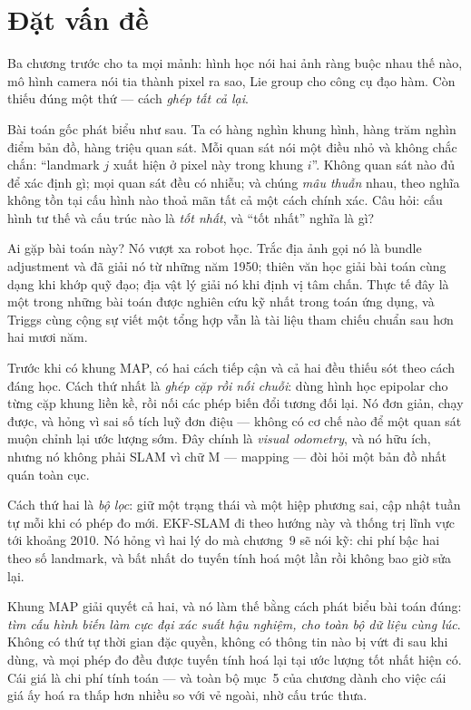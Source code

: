 \documentclass[../../vslam.tex]{subfiles}
\begin{document}
\section{Đặt vấn đề}

Ba chương trước cho ta mọi mảnh: hình học nói hai ảnh ràng buộc nhau thế nào, mô hình camera nói tia thành pixel ra sao, Lie group cho công cụ đạo hàm. Còn thiếu đúng một thứ --- cách \emph{ghép tất cả lại}.

Bài toán gốc phát biểu như sau. Ta có hàng nghìn khung hình, hàng trăm nghìn điểm bản đồ, hàng triệu quan sát. Mỗi quan sát nói một điều nhỏ và không chắc chắn: ``landmark \(j\) xuất hiện ở pixel này trong khung \(i\)''. Không quan sát nào đủ để xác định gì; mọi quan sát đều có nhiễu; và chúng \emph{mâu thuẫn} nhau, theo nghĩa không tồn tại cấu hình nào thoả mãn tất cả một cách chính xác. Câu hỏi: cấu hình tư thế và cấu trúc nào là \emph{tốt nhất}, và ``tốt nhất'' nghĩa là gì?

Ai gặp bài toán này? Nó vượt xa robot học. Trắc địa ảnh gọi nó là bundle adjustment và đã giải nó từ những năm 1950; thiên văn học giải bài toán cùng dạng khi khớp quỹ đạo; địa vật lý giải nó khi định vị tâm chấn. Thực tế đây là một trong những bài toán được nghiên cứu kỹ nhất trong toán ứng dụng, và Triggs cùng cộng sự \cite{triggs2000ba} viết một tổng hợp vẫn là tài liệu tham chiếu chuẩn sau hơn hai mươi năm.

Trước khi có khung MAP, có hai cách tiếp cận và cả hai đều thiếu sót theo cách đáng học. Cách thứ nhất là \emph{ghép cặp rồi nối chuỗi}: dùng hình học epipolar cho từng cặp khung liền kề, rồi nối các phép biến đổi tương đối lại. Nó đơn giản, chạy được, và hỏng vì sai số tích luỹ đơn điệu --- không có cơ chế nào để một quan sát muộn chỉnh lại ước lượng sớm. Đây chính là \emph{visual odometry}, và nó hữu ích, nhưng nó không phải SLAM vì chữ M --- mapping --- đòi hỏi một bản đồ nhất quán toàn cục.

Cách thứ hai là \emph{bộ lọc}: giữ một trạng thái và một hiệp phương sai, cập nhật tuần tự mỗi khi có phép đo mới. EKF-SLAM đi theo hướng này và thống trị lĩnh vực tới khoảng 2010. Nó hỏng vì hai lý do mà chương~9 sẽ nói kỹ: chi phí bậc hai theo số landmark, và bất nhất do tuyến tính hoá một lần rồi không bao giờ sửa lại.

Khung MAP giải quyết cả hai, và nó làm thế bằng cách phát biểu bài toán đúng: \emph{tìm cấu hình biến làm cực đại xác suất hậu nghiệm, cho toàn bộ dữ liệu cùng lúc}. Không có thứ tự thời gian đặc quyền, không có thông tin nào bị vứt đi sau khi dùng, và mọi phép đo đều được tuyến tính hoá lại tại ước lượng tốt nhất hiện có. Cái giá là chi phí tính toán --- và toàn bộ mục~5 của chương dành cho việc cái giá ấy hoá ra thấp hơn nhiều so với vẻ ngoài, nhờ cấu trúc thưa.
\end{document}
